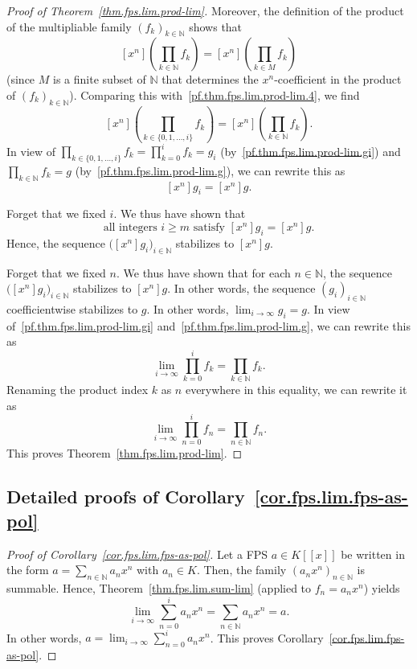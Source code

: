 \begin{proof}[Proof of Theorem~\ref{thm.fps.lim.prod-lim}]
Moreover, the definition of the product of the multipliable family
$(f_k)_{k\in\mathbb{N}}$ shows that
\[
[x^n]\left(\prod_{k\in\mathbb{N}} f_k\right)
= [x^n]\left(\prod_{k\in M} f_k\right)
\]
(since $M$ is a finite subset of $\mathbb{N}$ that determines the
$x^n$-coefficient in the product of $(f_k)_{k\in\mathbb{N}}$).
Comparing this with~\eqref{pf.thm.fps.lim.prod-lim.4}, we find
\[
[x^n]\left(\prod_{k\in\{0,1,\ldots,i\}} f_k\right)
= [x^n]\left(\prod_{k\in\mathbb{N}} f_k\right).
\]
In view of $\prod_{k\in\{0,1,\ldots,i\}} f_k = \prod_{k=0}^{i} f_k = g_i$
(by~\eqref{pf.thm.fps.lim.prod-lim.gi}) and
$\prod_{k\in\mathbb{N}} f_k = g$
(by~\eqref{pf.thm.fps.lim.prod-lim.g}), we can rewrite this as
\[
[x^n] g_i = [x^n] g.
\]

Forget that we fixed $i$. We thus have shown that
\[
\text{all integers } i\geq m \text{ satisfy } [x^n] g_i = [x^n] g.
\]
Hence, the sequence $\bigl([x^n] g_i\bigr)_{i\in\mathbb{N}}$ stabilizes
to $[x^n] g$.

Forget that we fixed $n$. We thus have shown that for each
$n\in\mathbb{N}$, the sequence $\bigl([x^n] g_i\bigr)_{i\in\mathbb{N}}$
stabilizes to $[x^n] g$. In other words, the sequence
$(g_i)_{i\in\mathbb{N}}$ coefficientwise stabilizes to $g$. In other
words, $\lim_{i\to\infty} g_i = g$. In view
of~\eqref{pf.thm.fps.lim.prod-lim.gi}
and~\eqref{pf.thm.fps.lim.prod-lim.g}, we can rewrite this as
\[
\lim_{i\to\infty} \prod_{k=0}^{i} f_k = \prod_{k\in\mathbb{N}} f_k.
\]
Renaming the product index $k$ as $n$ everywhere in this equality, we
can rewrite it as
\[
\lim_{i\to\infty} \prod_{n=0}^{i} f_n = \prod_{n\in\mathbb{N}} f_n.
\]
This proves Theorem~\ref{thm.fps.lim.prod-lim}.
\end{proof}

\subsection{Detailed proofs of Corollary~\ref{cor.fps.lim.fps-as-pol}}

\begin{proof}[Proof of Corollary~\ref{cor.fps.lim.fps-as-pol}]
\leanok
Let a FPS $a\in K[[x]]$ be written in the form
$a = \sum_{n\in\mathbb{N}} a_n x^n$ with $a_n\in K$.
Then, the family $(a_n x^n)_{n\in\mathbb{N}}$ is summable.
Hence, Theorem~\ref{thm.fps.lim.sum-lim} (applied to $f_n = a_n x^n$)
yields
\[
\lim_{i\to\infty} \sum_{n=0}^{i} a_n x^n
= \sum_{n\in\mathbb{N}} a_n x^n = a.
\]
In other words, $a = \lim_{i\to\infty} \sum_{n=0}^{i} a_n x^n$.
This proves Corollary~\ref{cor.fps.lim.fps-as-pol}.
\end{proof}


